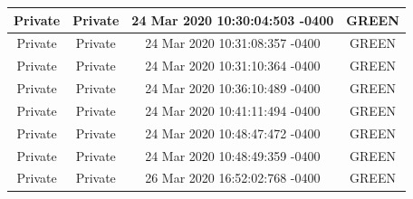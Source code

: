 \documentclass{article}
\begin{document}
\begin{longtable}[c]{| c | c | c | c |}
    	\hline
             {Private} & {Private} & {24 Mar 2020 10:30:04:503 -0400} & {GREEN} \\ 
    	\hline
             {Private} & {Private} & {24 Mar 2020 10:31:08:357 -0400} & {GREEN} \\ 
    	\hline
             {Private} & {Private} & {24 Mar 2020 10:31:10:364 -0400} & {GREEN} \\ 
    	\hline
             {Private} & {Private} & {24 Mar 2020 10:36:10:489 -0400} & {GREEN} \\ 
    	\hline
             {Private} & {Private} & {24 Mar 2020 10:41:11:494 -0400} & {GREEN} \\ 
    	\hline
             {Private} & {Private} & {24 Mar 2020 10:48:47:472 -0400} & {GREEN} \\ 
    	\hline
             {Private} & {Private} & {24 Mar 2020 10:48:49:359 -0400} & {GREEN} \\ 
    	\hline
             {Private} & {Private} & {26 Mar 2020 16:52:02:768 -0400} & {GREEN} \\ 
    	\hline
     \end{longtable}

\pagebreak
\end{document}
